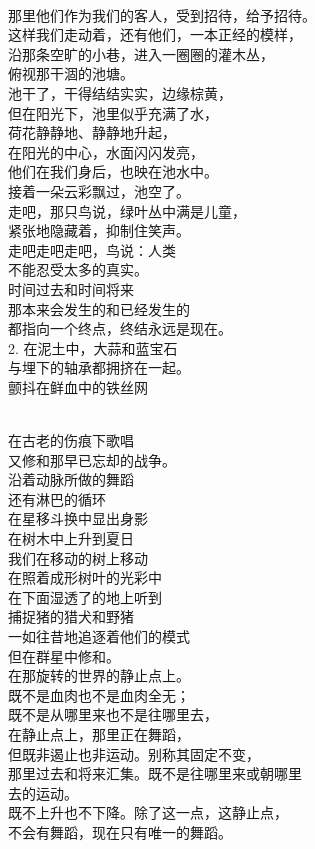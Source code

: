 \documentclass{article}
\begin{document}
\newpage 


\\
那里他们作为我们的客人，受到招待，给予招待。\\
这样我们走动着，还有他们，一本正经的模样，\\
沿那条空旷的小巷，进入一圈圈的灌木丛，\\
俯视那干涸的池塘。\\
池干了，干得结结实实，边缘棕黄，\\
但在阳光下，池里似乎充满了水，\\
荷花静静地、静静地升起，\\
在阳光的中心，水面闪闪发亮，\\
他们在我们身后，也映在池水中。\\
接着一朵云彩飘过，池空了。\\
走吧，那只鸟说，绿叶丛中满是儿童，\\
紧张地隐藏着，抑制住笑声。\\
走吧走吧走吧，鸟说：人类\\
不能忍受太多的真实。\\
时间过去和时间将来\\
那本来会发生的和已经发生的\\
都指向一个终点，终结永远是现在。\\
2. 在泥土中，大蒜和蓝宝石\\
与埋下的轴承都拥挤在一起。\\
颤抖在鲜血中的铁丝网

\newpage 


\\
在古老的伤痕下歌唱\\
又修和那早已忘却的战争。\\
沿着动脉所做的舞蹈\\
还有淋巴的循环\\
在星移斗换中显出身影\\
在树木中上升到夏日\\
我们在移动的树上移动\\
在照着成形树叶的光彩中\\
在下面湿透了的地上听到\\
捕捉猪的猎犬和野猪\\
一如往昔地追逐着他们的模式\\
但在群星中修和。\\
在那旋转的世界的静止点上。\\
既不是血肉也不是血肉全无；\\
既不是从哪里来也不是往哪里去，\\
在静止点上，那里正在舞蹈，\\
但既非遏止也非运动。别称其固定不变，\\
那里过去和将来汇集。既不是往哪里来或朝哪里\\
去的运动。\\
既不上升也不下降。除了这一点，这静止点，\\
不会有舞蹈，现在只有唯一的舞蹈。
\end{document}
